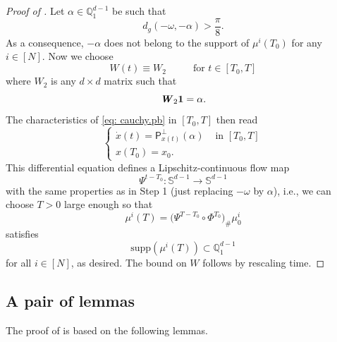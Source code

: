 \documentclass[a4paper,11pt]{article}
\theoremstyle{plain}
\newcommand{\supp}{\mathrm{supp}}
\newcommand{\proj}{\bm{\mathsf{P}}^\perp}
\renewcommand{\S}{\mathbb{S}^{d-1}}
\newcommand{\bW}{\bm{\mathit{W}}}
\newcommand{\Q}{\mathbb{Q}}
\numberwithin{equation}{section}
\begin{document}
\begin{proof}[Proof of ]
Let $\alpha\in\mathbb{Q}_1^{d-1}$ be such that
\begin{equation*}
  d_g(-\omega,-\alpha)>\frac\pi8.  
\end{equation*}
As a consequence, $-\alpha$ does not belong to the support of $\mu^i(T_0)$ for any $i\in[N]$. Now we choose 
\begin{equation*}
    \bW(t)\equiv \bW_2 \hspace{1cm} \text{ for } t\in[T_0,T]
\end{equation*} 
where $\bW_2$ is any $d\times d$ matrix such that
\begin{equation*}
    \bW_2{\bf 1}=\alpha.
\end{equation*}
The characteristics of \eqref{eq: cauchy.pb} in $[T_0,T]$ then read
\begin{equation*}
\begin{cases}
       \dot{x}(t)=\proj_{{x(t)}}(\alpha) &\text{ in }[T_0, T]\\
x(T_0)=x_0.
\end{cases}
\end{equation*}
This differential equation defines a Lipschitz-continuous flow map 
$$\Psi^{t-T_0}:\S\to\S$$ 
with the same properties as in Step 1 (just replacing $-\omega$ by $\alpha$), i.e., we can choose $T>0$ large enough so that
\begin{equation*}
\mu^i(T)=\Big(\Psi^{T-T_0}\circ\Phi^{T_0}\Big)_\#\mu_{0}^i
\end{equation*}
satisfies
\begin{equation*}
    \supp(\mu^i(T))\subset \Q_1^{d-1}
\end{equation*}
for all $i\in[N]$, as desired. The bound on $\bW$ follows by rescaling time. \qedhere
\end{proof}


\subsection{A pair of lemmas}

The proof of  is based on the following lemmas.
\end{document}
